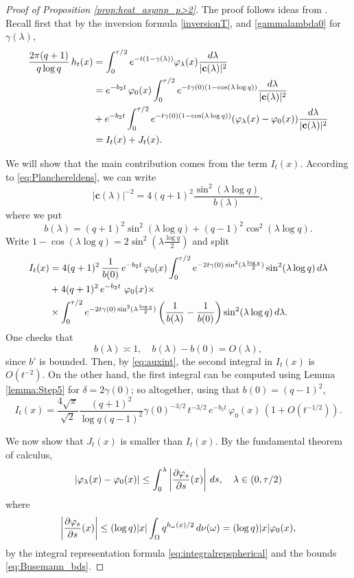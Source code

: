 \documentclass[11pt,a4paper,reqno]{amsart}
\theoremstyle{plain}
\theoremstyle{remark}
\theoremstyle{definition}
\theoremstyle{remark}
\numberwithin{equation}{section}
\def\int{\intop\nolimits}
\begin{document}
	\begin{proof}[Proof of Proposition \ref{prop:heat_asymp_p>2}]
		The proof follows ideas from \cite[Step 5]{AJ99}. Recall first that by the inversion formula \eqref{inversionT}, and \eqref{gammalambda0} for $\gamma(\lambda)$,
		\begin{align}
			\frac{2\pi(q+1)}{q\log q}\, h_t(x)&=\int_{0}^{\tau /2}e^{-t(1-\gamma(\lambda))}\varphi_{\lambda}(x)\frac{d \lambda}{|\textbf{c}(\lambda)|^2} \quad \notag\\
			&=e^{-b_2t}\, \varphi_0(x)\int_{0}^{\tau /2}e^{-t\gamma(0)(1-\cos(\lambda \log q))}\frac{d \lambda}{|\textbf{c}(\lambda)|^2} \notag\\
			&+e^{-b_2t}\int_{0}^{\tau /2}e^{-t\gamma(0)(1-\cos(\lambda \log q))}(\varphi_{\lambda}(x)-\varphi_0(x))\frac{d \lambda}{|\textbf{c}(\lambda)|^2} \notag \\
			&=I_t(x)+J_t(x). \label{eq:I+J}
		\end{align}	
		
        We will show that the main contribution comes from the term  $I_t(x)$.
		According to \eqref{eq:Planchereldens}, we can write 
		\[
		|\textbf{c}(\lambda)|^{-2}=4(q+1)^2\frac{\sin^2(\lambda \log q)}{b(\lambda)}, 
        \]
        where we put
        \[b(\lambda)=(q+1)^2\sin ^2(\lambda \log q)+(q-1)^2 \cos ^2(\lambda \log q).
		\]
		Write $1-\cos(\lambda \log q)=2\sin^2(\lambda\frac{\log q}{2})$ and split
		\begin{align*}
			I_t(x)&=4(q+1)^2\,\frac{1}{b(0)}\,e^{-b_2t}\, \varphi_0(x)\int_0^{\tau/2}e^{-2t\gamma(0)\sin^2(\lambda \frac{\log q}{2})}\sin^2(\lambda \log q)\, d\lambda \\
			&+4(q+1)^2\,e^{-b_2t}\ \varphi_0(x) \times\\
            &\times\int_0^{\tau/2}e^{-2t\gamma(0)\sin^2(\lambda \frac{\log q}{2})}\left(\frac{1}{b(\lambda)}-\frac{1}{b(0)}\right)\sin^2(\lambda \log q)\, d\lambda.
		\end{align*}
		One checks that $$b(\lambda)\asymp 1, \quad b(\lambda)-b(0)=O(\lambda),$$ since $b'$ is bounded. Then, by \eqref{eq:auxint}, the second integral in $I_t(x)$ is $O(t^{-2})$. On the other hand, the first integral can be computed using Lemma \ref{lemma:Step5} for $\delta=2\gamma(0)$;  so altogether, using that $b(0)=(q-1)^2$,
		\[
		I_t(x)=\frac{4\sqrt{\pi}}{\sqrt{2}}\frac{(q+1)^2}{\log q(q-1)^2}\gamma(0)^{-3/2}\,t^{-3/2}\, e^{-b_2t}\, \varphi_0(x)\,(1+O(t^{-1/2})).
		\]
		
		We now show that $J_t(x)$  is smaller than $I_t(x)$. 
		By the fundamental theorem of calculus,
\[
|\varphi_\lambda(x)-\varphi_0(x)|
\leq
\int_0^\lambda
\left|\frac{\partial\varphi_s}{\partial s}(x)\right|\,ds, \quad \lambda\in (0, \tau/2)
\]
where
$$\left|\frac{\partial\varphi_s}{\partial s}(x)\right|
\leq
(\log q)|x|
\int_\Omega q^{h_\omega(x)/2}\,d\nu(\omega)
=
(\log q)|x|\varphi_0(x),$$
		 by the integral representation formula \eqref{eq:integralrepspherical} and the bounds \eqref{eq:Busemann_bds}.
        

\end{proof}
\end{document}
